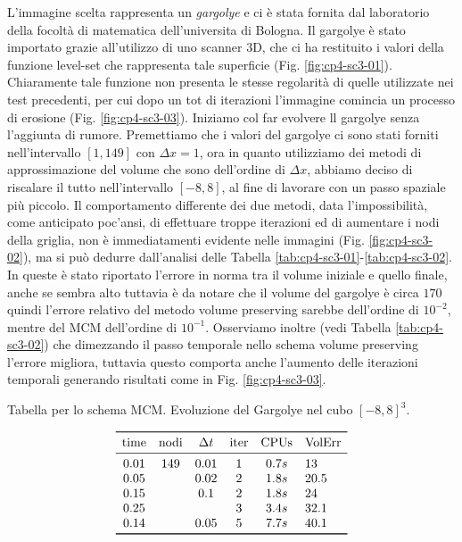 L'immagine scelta rappresenta un \emph{gargolye} e ci è stata fornita
dal laboratorio della focoltà di matematica dell'universita di
Bologna. Il gargolye è stato importato grazie all'utilizzo di uno
scanner 3D, che ci ha restituito i valori della funzione level-set che
rappresenta tale superficie (Fig. \ref{fig:cp4-sc3-01}).  Chiaramente tale funzione non presenta le stesse regolarità di quelle utilizzate nei test
precedenti, per cui dopo un tot di iterazioni l'immagine comincia un
processo di erosione (Fig. \ref{fig:cp4-sc3-03}). Iniziamo col
far evolvere ll gargolye senza l'aggiunta di rumore. Premettiamo che i
valori del gargolye ci sono stati forniti nell'intervallo $[1,149]$ con
$\Delta x=1$, ora in quanto utilizziamo dei metodi di approssimazione
del volume che sono dell'ordine di $\Delta x$, abbiamo deciso di
riscalare il tutto nell'intervallo $[-8,8]$, al fine di lavorare con
un passo spaziale più piccolo. Il comportamento differente dei due metodi,
data l'impossibilità, come anticipato poc'ansi, di effettuare troppe
iterazioni ed di aumentare i nodi della griglia, non è immediatamenti
evidente nelle immagini (Fig. \ref{fig:cp4-sc3-02}), ma si può
dedurre dall'analisi delle
Tabella \ref{tab:cp4-sc3-01}-\ref{tab:cp4-sc3-02}. In queste è stato
riportato  l'errore in norma tra il volume iniziale e quello finale,
anche se sembra alto tuttavia è da notare che il volume del gargolye è
circa $170$ quindi l'errore relativo del metodo volume preserving
sarebbe dell'ordine di $10^{-2}$, mentre del MCM dell'ordine di
$10^{-1}$. Osserviamo inoltre (vedi Tabella \ref{tab:cp4-sc3-02})
che dimezzando il passo temporale nello schema volume preserving
l'errore migliora, tuttavia questo comporta anche l'aumento delle
iterazioni temporali generando risultati come in Fig. \ref{fig:cp4-sc3-03}.

\begin{table}[htb!]
\caption{Tabella per lo schema MCM. Evoluzione del Gargolye nel cubo
  $[-8,8]^3$.}
\label{tab:cp4-sc3-01}
\[
\begin{array}{*{5}{c}l}
    \toprule
    \text{time} &\text{nodi} &\Delta t &\text{iter} &\text{CPUs}&\text{VolErr} \\
    \midrule
     0.01       & 149        & 0.01    & 1          & 0.7s     &13\\
     0.05       &            & 0.02    & 2          & 1.8s     &20.5\\ 
     0.15       &            & 0.1     & 2          & 1.8s     &24\\ 
     0.25       &            &         & 3          & 3.4s     &32.1\\
     0.14       &            & 0.05    & 5          & 7.7s    &40.1\\     
     \bottomrule
\end{array}
\]
\end{table}

